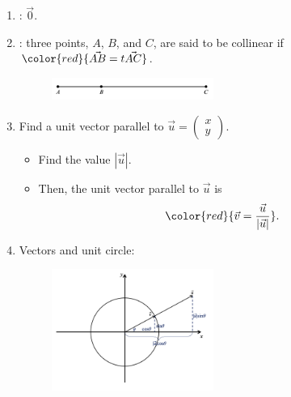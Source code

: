 \documentclass[12pt, a4paper]{article}
\newtheorem{proof}{Proof}[subsection]
\begin{document}
\begin{enumerate}
  $${\color{red}{\vec{a}-\vec{b}=\begin{pmatrix}x-m\\y-n\end{pmatrix}}}.$$
  \begin{proof}
    $$\begin{aligned}
      -\vec{b}&=(-1)\vec{b}=\begin{pmatrix}-m\\-n\end{pmatrix}\\
      \vec{a}-\vec{b}&=\vec{a}+\left(-\vec{b}\right)=\begin{pmatrix}x-m\\y-n\end{pmatrix}.
    \end{aligned}$$
  \end{proof}
  \item \textbf{\color{red}{Zero vector}}: $\vec{0}$.
  \item \textbf{\color{red}{Collinear points}}: three points, $A$, $B$, and $C$, are said to be collinear if ${\color{red}{\vec{AB}=t\vec{AC}}}$.
  \begin{figure}[H]
    \centering
    \includegraphics[width=0.5\textwidth]{Fig.3.5.jpg}
  \end{figure}
  \item Find a unit vector parallel to $\vec{u}=\begin{pmatrix}x\\y\end{pmatrix}.$
  \begin{itemize}
    \item Find the value $\left|\vec{u}\right|.$
    \item Then, the unit vector parallel to $\vec{u}$ is 
    $${\color{red}{\vec{v}=\frac{\vec{u}}{\left|\vec{u}\right|}}}.$$
  \end{itemize}
  \item Vectors and unit circle: 
  \begin{figure}[H]
    \centering
    \includegraphics[width=0.5\textwidth]{Fig.3.6.jpg}

\end{figure}
\end{enumerate}
\end{document}
